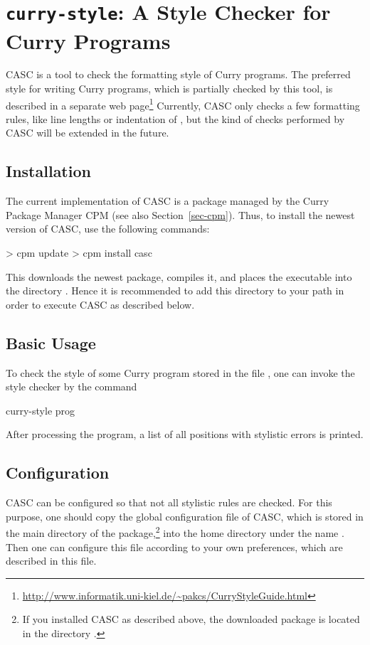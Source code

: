 \section{\texttt{curry-style}: A Style Checker for Curry Programs}
\label{sec-casc}

CASC
is a tool to check the formatting style of Curry programs.
The preferred style for writing Curry programs,
which is partially checked by this tool,
is described in a separate web page\footnote{%
\url{http://www.informatik.uni-kiel.de/~pakcs/CurryStyleGuide.html}}
Currently, CASC only checks a few formatting rules, like
line lengths or
indentation of , but the kind of checks
performed by CASC will be extended in the future.

\subsection{Installation}

The current implementation of CASC is a package
managed by the Curry Package Manager CPM
(see also Section~\ref{sec-cpm}).
Thus, to install the newest version of CASC, use the following commands:
%
\begin{curry}
> cpm update
> cpm install casc
\end{curry}
%
This downloads the newest package, compiles it, and places
the executable  into the directory .
Hence it is recommended to add this directory to your path
in order to execute CASC as described below.

\subsection{Basic Usage}

To check the style of some Curry program stored
in the file ,
one can invoke the style checker by
the command
%
\begin{curry}
curry-style prog
\end{curry}
%
After processing the program, a list of all positions
with stylistic errors is printed.


\subsection{Configuration}

CASC can be configured so that not all stylistic rules are checked.
For this purpose, one should copy the global configuration file
 of CASC,
which is stored in the main directory of the package,\footnote{%
If you installed CASC as described above,
the downloaded package is located in the directory
.}
into the home directory under the name .
Then one can configure this file according to your own preferences,
which are described in this file.

